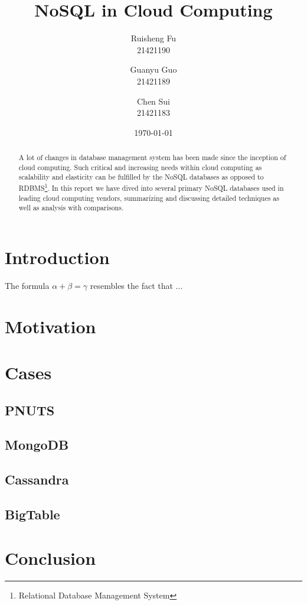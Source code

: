 \documentclass[10pt,a4paper]{article}
\author{Ruisheng Fu\\21421190\\
\and
Guanyu Guo\\21421189\\
\and
Chen Sui\\21421183}
\title{NoSQL in Cloud Computing}
\date{\today}
\begin{document}
\maketitle
\tableofcontents

\begin{abstract}
A lot of changes in database management system has been made since the inception of cloud computing. Such critical and increasing needs within cloud computing as scalability and elasticity can be fulfilled by the NoSQL databases as opposed to RDBMS\footnote{Relational Database Management System}. In this report we have dived into several primary NoSQL databases used in leading cloud computing vendors, summarizing and discussing detailed techniques as well as analysis with comparisons. 
\end{abstract}

\section{Introduction}
The formula $\alpha + \beta = \gamma$ resembles the fact that ...\cite{Chang2006}

\section{Motivation}

\section{Cases}

\subsection{PNUTS}

\subsection{MongoDB}

\subsection{Cassandra}

\subsection{BigTable}

\section{Conclusion}


\end{document}
